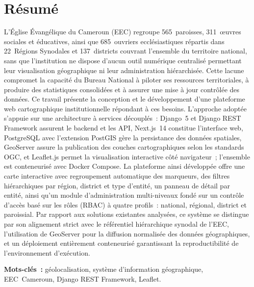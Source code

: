 \documentclass[12pt, a4paper]{report}
\begin{document}

\chapter*{Résumé}

\noindent
L'Église Évangélique du Cameroun (EEC) regroupe 565~paroisses, 311~œuvres
sociales et éducatives, ainsi que 685~ouvriers ecclésiastiques répartis dans
22~Régions Synodales et 137~districts couvrant l'ensemble du territoire
national, sans que l'institution ne dispose d'aucun outil numérique centralisé
permettant leur visualisation géographique ni leur administration hiérarchisée.
Cette lacune compromet la capacité du Bureau National à piloter ses ressources
territoriales, à produire des statistiques consolidées et à assurer une mise à
jour contrôlée des données. Ce travail présente la conception et le développement
d'une plateforme web cartographique institutionnelle répondant à ces besoins.
L'approche adoptée s'appuie sur une architecture à services découplés~: Django~5
et Django REST Framework assurent le backend et les API, Next.js~14 constitue
l'interface web, PostgreSQL avec l'extension PostGIS gère la persistance des
données spatiales, GeoServer assure la publication des couches cartographiques
selon les standards OGC, et Leaflet.js permet la visualisation interactive côté
navigateur~; l'ensemble est conteneurisé avec Docker Compose. La plateforme
ainsi développée offre une carte interactive avec regroupement automatique des
marqueurs, des filtres hiérarchiques par région, district et type d'entité, un
panneau de détail par entité, ainsi qu'un module d'administration multi-niveaux
fondé sur un contrôle d'accès basé sur les rôles (RBAC) à quatre profils~:
national, régional, district et paroissial. Par rapport aux solutions existantes
analysées, ce système se distingue par son alignement strict avec le référentiel
hiérarchique synodal de l'EEC, l'utilisation de GeoServer pour la diffusion
normalisée des données géographiques, et un déploiement entièrement conteneurisé
garantissant la reproductibilité de l'environnement d'exécution.

\smallskip
\noindent\textbf{Mots-clés~:}
géolocalisation, système d'information géographique, EEC~Cameroun,
Django REST Framework, Leaflet.
\end{document}
